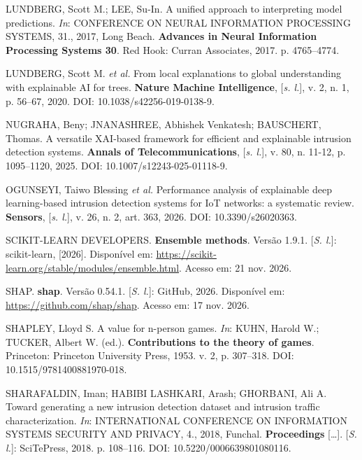 \documentclass[
  12pt,
  oneside,
  a4paper,
  chapter=TITLE,
  sumario=tradicional,
  english,
  brazil
]{abntex2}
\begin{document}
LUNDBERG, Scott M.; LEE, Su-In. A unified approach to interpreting model predictions. \emph{In}:
CONFERENCE ON NEURAL INFORMATION PROCESSING SYSTEMS, 31., 2017, Long Beach. \textbf{Advances in
Neural Information Processing Systems 30}. Red Hook: Curran Associates, 2017. p. 4765--4774.\par

LUNDBERG, Scott M. \emph{et al.} From local explanations to global understanding with explainable
AI for trees. \textbf{Nature Machine Intelligence}, [\emph{s. l.}], v. 2, n. 1, p. 56--67, 2020.
DOI: 10.1038/s42256-019-0138-9.\par

NUGRAHA, Beny; JNANASHREE, Abhishek Venkatesh; BAUSCHERT, Thomas. A versatile XAI-based framework
for efficient and explainable intrusion detection systems. \textbf{Annals of Telecommunications},
[\emph{s. l.}], v. 80, n. 11-12, p. 1095--1120, 2025. DOI: 10.1007/s12243-025-01118-9.\par

OGUNSEYI, Taiwo Blessing \emph{et al.} Performance analysis of explainable deep learning-based
intrusion detection systems for IoT networks: a systematic review. \textbf{Sensors},
[\emph{s. l.}], v. 26, n. 2, art. 363, 2026. DOI: 10.3390/s26020363.\par

SCIKIT-LEARN DEVELOPERS. \textbf{Ensemble methods}. Versão 1.9.1. [\emph{S. l.}]: scikit-learn,
[2026]. Disponível em: \url{https://scikit-learn.org/stable/modules/ensemble.html}. Acesso em: 21
nov. 2026.\par

SHAP. \textbf{shap}. Versão 0.54.1. [\emph{S. l.}]: GitHub, 2026. Disponível em:
\url{https://github.com/shap/shap}. Acesso em: 17 nov. 2026.\par

SHAPLEY, Lloyd S. A value for n-person games. \emph{In}: KUHN, Harold W.; TUCKER, Albert W. (ed.).
\textbf{Contributions to the theory of games}. Princeton: Princeton University Press, 1953. v. 2,
p. 307--318. DOI: 10.1515/9781400881970-018.\par

SHARAFALDIN, Iman; HABIBI LASHKARI, Arash; GHORBANI, Ali A. Toward generating a new intrusion
detection dataset and intrusion traffic characterization. \emph{In}: INTERNATIONAL CONFERENCE ON
INFORMATION SYSTEMS SECURITY AND PRIVACY, 4., 2018, Funchal. \textbf{Proceedings} [\ldots].
[\emph{S. l.}]: SciTePress, 2018. p. 108--116. DOI: 10.5220/0006639801080116.\par
\end{document}
